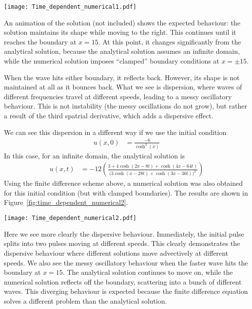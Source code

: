 \documentclass[twocolumn]{myarticle}
\numberwithin{equation}{section}
\begin{document}
\begin{figure*}[ht]
    \centering
    \texttt{[image: Time\_dependent\_numerical1.pdf]}
    \caption{Numerical solutions to the time-dependent PDE (shown as dots) compared with the analytical solution (solid line).}
    \label{fig:time_dependent_numerical1}
\end{figure*}

An animation of the solution (not included) shows the expected behaviour: the solution maintains its shape while moving to the right.
This continues until it reaches the boundary at $ x = 15 $.
At this point, it changes significantly from the analytical solution, because the analytical solution assumes an infinite domain, while the numerical solution imposes ``clamped'' boundary conditions at $ x = \pm 15 $.

When the wave hits either boundary, it reflects back.
However, its shape is not maintained at all as it bounces back.
What we see is dispersion, where waves of different frequencies travel at different speeds, leading to a messy oscillatory behaviour.
This is not instability (the messy oscillations do not grow), but rather a result of the third spatrial derivative, which adds a dispersive effect.

We can see this dispersion in a different way if we use the initial condition
\begin{align}
    u(x,0) &= \frac{-6}{\cosh^2(x)}
\end{align}
In this case, for an infinite domain, the analytical solution is
\begin{align}
    u(x,t) &= -12 \left( \frac{3 + 4 \cosh(2x - 8t) + \cosh(4x - 64t)}{\big( 3 \cosh(x - 28 t) + \cosh(3x - 36 t) \big)^2} \right)
\end{align}
Using the finite difference scheme above, a numerical solution was also obtained for this initial condition (but with clamped boundaries).
The results are shown in Figure~\ref{fig:time_dependent_numerical2}.

\begin{figure*}[ht]
    \centering
    \texttt{[image: Time\_dependent\_numerical2.pdf]}
    \caption{Numerical solutions to the time-dependent PDE (shown as dots) compared with the analytical solution (solid line).}
    \label{fig:time_dependent_numerical2}
\end{figure*}

Here we see more clearly the dispersive behaviour.
Immediately, the initial pulse splits into two pulses moving at different speeds.
This clearly demonstrates the dispersive behaviour where different solutions move advectively at different speeds.
We also see the messy oscillatory behaviour when the faster wave hits the boundary at $ x = 15 $.
The analytical solution continues to move on, while the numerical solution reflects off the boundary, scattering into a bunch of different waves.
This diverging behaviour is expected because the finite difference equation solves a different problem than the analytical solution.
\end{document}
